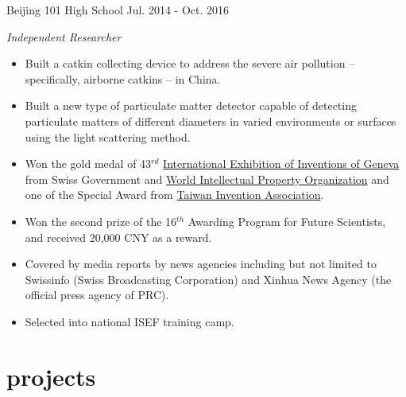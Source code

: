 \documentclass[hidelinks__VERSION__]{adamyi-cv}
\begin{document}
\begin{entrylist}
\entry
{Beijing 101 High School}
{Jul. 2014 - Oct. 2016}
{\emph{Independent Researcher}
\begin{itemize}
\item Built a catkin collecting device to address the severe air pollution – specifically, airborne catkins – in China.
\item Built a new type of particulate matter detector capable of detecting particulate matters of different diameters in varied environments or surfaces using the light scattering method.
\item Won the gold medal of 43$^{rd}$ \href{http://www.inventions-geneva.ch/en/}{International Exhibition of Inventions of Geneva} from Swiss Government and \href{http://www.wipo.int/}{World Intellectual Property Organization} and one of the Special Award from \href{http://www.tia-tw.net/}{Taiwan Invention Association}.
\item Won the second prize of the 16$^{th}$ Awarding Program for Future Scientists, and received 20,000 CNY as a reward.
\item Covered by media reports by news agencies including but not limited to Swissinfo (Swiss Broadcasting Corporation) and Xinhua News Agency (the official press agency of PRC).
\item Selected into national ISEF training camp.
\end{itemize}}


\end{entrylist}

\pagebreak


\section{projects}
\end{document}
